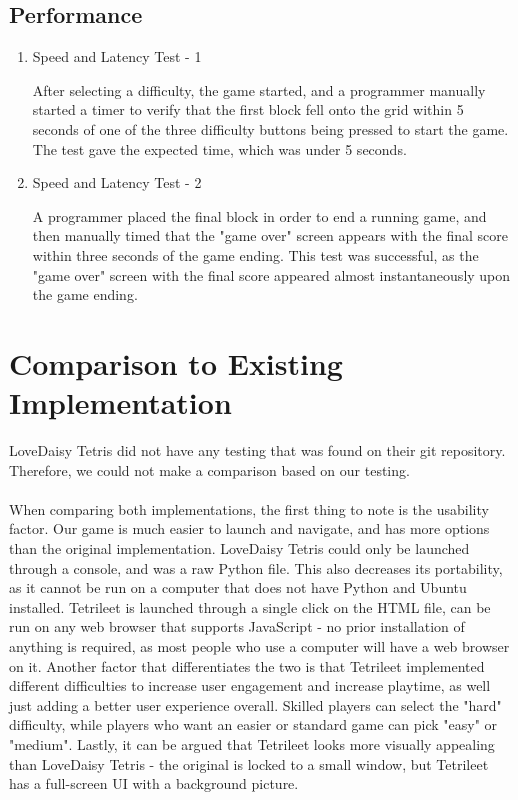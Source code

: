 \documentclass[12pt, titlepage]{article}
\begin{document}
\subsection{Performance}

\begin{enumerate}

\item{Speed and Latency Test - 1\\}

After selecting a difficulty, the game started, and a programmer manually started a timer to verify that the first block fell onto the grid within 5 seconds of one of the three difficulty buttons being pressed to start the game. The test gave the expected time, which was under 5 seconds.

\item{Speed and Latency Test - 2\\}

A programmer placed the final block in order to end a running game, and then manually timed that the "game over" screen appears with the final score within three seconds of the game ending. This test was successful, as the "game over" screen with the final score appeared almost instantaneously upon the game ending.

\end{enumerate}
\section{Comparison to Existing Implementation}	
LoveDaisy Tetris did not have any testing that was found on their git repository. Therefore, we could not make a comparison based on our testing.
\\\\
When comparing both implementations, the first thing to note is the usability factor. Our game is much easier to launch and navigate, and has more options than the original implementation. LoveDaisy Tetris could only be launched through a console, and was a raw Python file. This also decreases its portability, as it cannot be run on a computer that does not have Python and Ubuntu installed. Tetrileet is launched through a single click on the HTML file, can be run on any web browser that supports JavaScript - no prior installation of anything is required, as most people who use a computer will have a web browser on it. Another factor that differentiates the two is that Tetrileet implemented different difficulties to increase user engagement and increase playtime, as well just adding a better user experience overall. Skilled players can select the "hard" difficulty, while players who want an easier or standard game can pick "easy" or "medium". Lastly, it can be argued that Tetrileet looks more visually appealing than LoveDaisy Tetris - the original is locked to a small window, but Tetrileet has a full-screen UI with a background picture.
\end{document}
